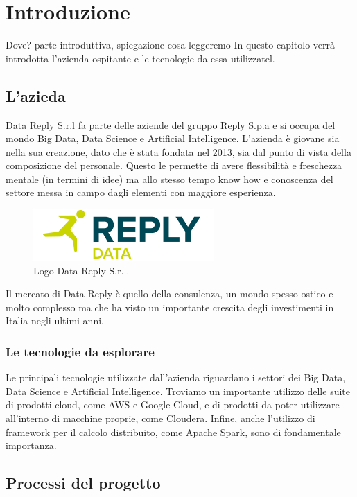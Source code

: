 \chapter{Introduzione}
\label{Introduzione}
Dove?
parte introduttiva, spiegazione cosa leggeremo
In questo capitolo verrà introdotta l'azienda ospitante e le tecnologie da essa utilizzatel.
\section{L'azieda}
Data Reply S.r.l fa parte delle aziende del gruppo Reply S.p.a e si occupa del mondo Big Data, Data Science e Artificial Intelligence. L'azienda è giovane sia nella sua creazione, dato che è stata fondata nel 2013, sia dal punto di vista della composizione del personale. Questo le permette di avere flessibilità e freschezza mentale (in termini di idee) ma allo stesso tempo know how e conoscenza del settore messa in campo dagli elementi con maggiore esperienza.

\begin{figure}
	\centering
	\includegraphics[scale=2]{figures/data-reply-logo}
	\caption[Short figure name.]{Logo Data Reply S.r.l.
		\label{fig:logoDataReply}}
\end{figure}

Il mercato di Data Reply è quello della consulenza, un mondo spesso ostico e molto complesso ma che ha visto un importante crescita degli investimenti in Italia negli ultimi anni.
\subsection{Le tecnologie da esplorare}
Le principali tecnologie utilizzate dall'azienda riguardano i settori dei Big Data, Data Science e Artificial Intelligence. Troviamo un importante utilizzo delle suite di prodotti cloud, come \gls{AWS} e \gls{Google Cloud}, e di prodotti da poter utilizzare all'interno di macchine proprie, come \gls{Cloudera}. Infine, anche l'utilizzo di framework per il calcolo distribuito, come \gls{Apache Spark}, sono di fondamentale importanza.
\section{Processi del progetto}
